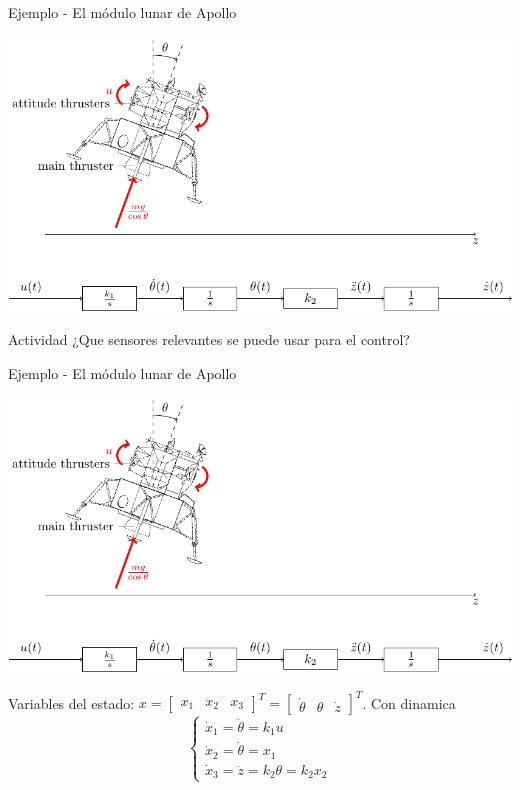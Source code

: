 \documentclass[presentation,aspectratio=1610]{beamer}
\begin{document}
\begin{frame}[label={sec:org6a0767b}]{Ejemplo - El módulo lunar de Apollo}
\begin{center}
\includegraphics[width=0.8\linewidth]{fig-apollo}
\end{center}
\alert{Actividad} ¿Que sensores relevantes se puede usar para el control?
\end{frame}

\begin{frame}[label={sec:orgef2ffad}]{Ejemplo - El módulo lunar de Apollo}
\begin{center}
\includegraphics[width=0.7\linewidth]{fig-apollo}
\end{center}

Variables del estado: \(x = \begin{bmatrix} x_1 & x_2 & x_3 \end{bmatrix}^T = \begin{bmatrix} \dot{\theta} & \theta & \dot{z} \end{bmatrix}^T\). Con dinamica
\[ \begin{cases} \dot{x}_1 =  \ddot{\theta} = k_1 u\\ \dot{x}_2 = \dot{\theta} = x_1\\ \dot{x}_3 = \ddot{z} = k_2\theta = k_2x_2 \end{cases} \]
\end{frame}
\end{document}
